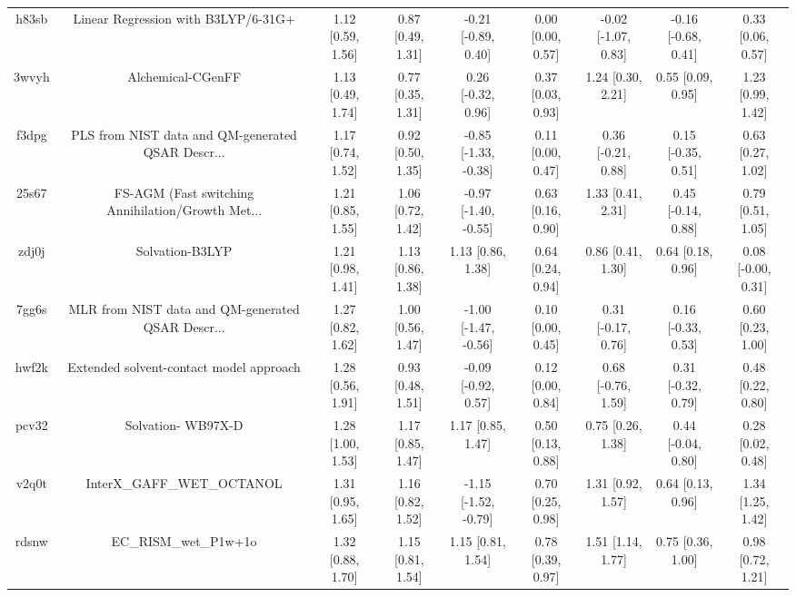 \documentclass{article}
\begin{document}
\begin{center}
\begin{longtable}{|ccccccccc|}
 h83sb &                Linear Regression with B3LYP/6-31G+ &  1.12 [0.59, 1.56] &  0.87 [0.49, 1.31] &   -0.21 [-0.89, 0.40] &  0.00 [0.00, 0.57] &  -0.02 [-1.07, 0.83] &  -0.16 [-0.68, 0.41] &     0.33 [0.06, 0.57] \\
 3wvyh &                                  Alchemical-CGenFF &  1.13 [0.49, 1.74] &  0.77 [0.35, 1.31] &    0.26 [-0.32, 0.96] &  0.37 [0.03, 0.93] &    1.24 [0.30, 2.21] &    0.55 [0.09, 0.95] &     1.23 [0.99, 1.42] \\
 f3dpg &  PLS from NIST data and QM-generated QSAR Descr... &  1.17 [0.74, 1.52] &  0.92 [0.50, 1.35] &  -0.85 [-1.33, -0.38] &  0.11 [0.00, 0.47] &   0.36 [-0.21, 0.88] &   0.15 [-0.35, 0.51] &     0.63 [0.27, 1.02] \\
 25s67 &  FS-AGM (Fast switching Annihilation/Growth Met... &  1.21 [0.85, 1.55] &  1.06 [0.72, 1.42] &  -0.97 [-1.40, -0.55] &  0.63 [0.16, 0.90] &    1.33 [0.41, 2.31] &   0.45 [-0.14, 0.88] &     0.79 [0.51, 1.05] \\
 zdj0j &                                    Solvation-B3LYP &  1.21 [0.98, 1.41] &  1.13 [0.86, 1.38] &     1.13 [0.86, 1.38] &  0.64 [0.24, 0.94] &    0.86 [0.41, 1.30] &    0.64 [0.18, 0.96] &    0.08 [-0.00, 0.31] \\
 7gg6s &  MLR from NIST data and QM-generated QSAR Descr... &  1.27 [0.82, 1.62] &  1.00 [0.56, 1.47] &  -1.00 [-1.47, -0.56] &  0.10 [0.00, 0.45] &   0.31 [-0.17, 0.76] &   0.16 [-0.33, 0.53] &     0.60 [0.23, 1.00] \\
 hwf2k &            Extended solvent-contact model approach &  1.28 [0.56, 1.91] &  0.93 [0.48, 1.51] &   -0.09 [-0.92, 0.57] &  0.12 [0.00, 0.84] &   0.68 [-0.76, 1.59] &   0.31 [-0.32, 0.79] &     0.48 [0.22, 0.80] \\
 pcv32 &                                 Solvation- WB97X-D &  1.28 [1.00, 1.53] &  1.17 [0.85, 1.47] &     1.17 [0.85, 1.47] &  0.50 [0.13, 0.88] &    0.75 [0.26, 1.38] &   0.44 [-0.04, 0.80] &     0.28 [0.02, 0.48] \\
 v2q0t &                         InterX\_GAFF\_WET\_OCTANOL &  1.31 [0.95, 1.65] &  1.16 [0.82, 1.52] &  -1.15 [-1.52, -0.79] &  0.70 [0.25, 0.98] &    1.31 [0.92, 1.57] &    0.64 [0.13, 0.96] &     1.34 [1.25, 1.42] \\
 rdsnw &                              EC\_RISM\_wet\_P1w+1o &  1.32 [0.88, 1.70] &  1.15 [0.81, 1.54] &     1.15 [0.81, 1.54] &  0.78 [0.39, 0.97] &    1.51 [1.14, 1.77] &    0.75 [0.36, 1.00] &     0.98 [0.72, 1.21] \\

\end{longtable}
\end{center}
\end{document}

